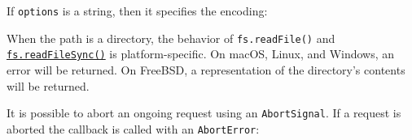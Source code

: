 If \texttt{options} is a string, then it specifies the encoding:

\begin{Shaded}
\begin{Highlighting}[]
 \OperatorTok{;}

\NormalTok{(}\OperatorTok{,} \OperatorTok{,}\OperatorTok{;}
\end{Highlighting}
\end{Shaded}

When the path is a directory, the behavior of \texttt{fs.readFile()} and
\hyperref[fsreadfilesyncpath-options]{\texttt{fs.readFileSync()}} is
platform-specific. On macOS, Linux, and Windows, an error will be
returned. On FreeBSD, a representation of the directory's contents will
be returned.

\begin{Shaded}
\begin{Highlighting}[]
 \OperatorTok{;}

\NormalTok{(}\OperatorTok{,}\OperatorTok{,}\KeywordTok{=\textgreater{}}\NormalTok{ \{}
\NormalTok{\})}\OperatorTok{;}

\NormalTok{(}\OperatorTok{,}\OperatorTok{,}\KeywordTok{=\textgreater{}}\NormalTok{ \{}
\NormalTok{\})}\OperatorTok{;}
\end{Highlighting}
\end{Shaded}

It is possible to abort an ongoing request using an
\texttt{AbortSignal}. If a request is aborted the callback is called
with an \texttt{AbortError}:

